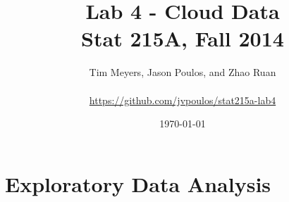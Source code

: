 \documentclass[11pt]{article}\usepackage[]{graphicx}\usepackage[]{color}
\begin{document}
\title{Lab 4 - Cloud Data\\
Stat 215A, Fall 2014}
\date{\today}
\author{Tim Meyers, Jason Poulos, and Zhao Ruan \\
\\
\url{https://github.com/jvpoulos/stat215a-lab4}}
\maketitle





\section{Exploratory Data Analysis}
\end{document}
